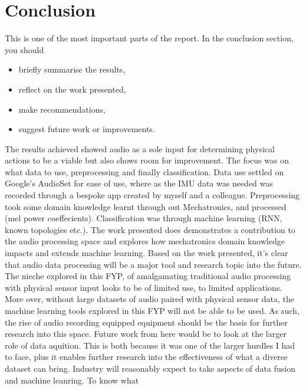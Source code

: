 \documentclass{UoNMCHA}
\numberwithin{equation}{section}
\begin{document}
\section{Conclusion}\label{sec:Conclusion}
This is one of the most important parts of the report. In the conclusion section, you  should 
\begin{itemize}
\item briefly summarise the results,
\item reflect on the work presented, 
\item make recommendations,
\item suggest future work or improvements.
\end{itemize}

The results achieved showed audio as a sole input for determining physical actions to be a viable but also shows room for improvement. The focus was on what data to use, preprocessing and finally classification. 
Data use settled on Google's AudioSet for ease of use, where as the IMU data was needed was recorded through a bespoke app created by myself and a colleague. Preprocessing took some domain knowledge learnt through out Mechatronics, and processed (mel power coeffecients). Classification was through machine learning (RNN, known topologies etc.). 
The work presented does demonstrates a contribution to the audio processing space and explores how mechatronics domain knowledge impacts and extends machine learning.
Based on the work presented, it's clear that audio data processing will be a major tool and research topic into the future. The nieche explored in this FYP, of amalgamating traditional audio processing with physical sensor input looks to be of limited use, to limited applications. More over, without large datasets of audio paired with physical sensor data, the machine learning tools explored in this FYP will not be able to be used. As such, the rise of audio recording equipped equipment should be the basis for further research into this space. 
Future work from here would be to look at the larger role of data aquition. This is both because it was one of the larger hurdles I had to face, plus it enables further research into the effectiveness of what a diverse dataset can bring. Industry will reasonably expect to take aspects of data fusion and machine leanring. To know what
\end{document}
